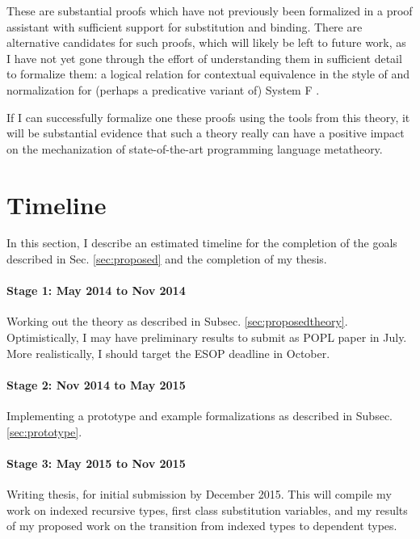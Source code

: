 \documentclass{article}
\begin{document}
These are substantial proofs which have not previously been
formalized in a proof assistant with sufficient support for
substitution and binding. There are alternative candidates for such
proofs, which will likely be left to future work, as I have not yet
gone through the effort of understanding them in sufficient detail to
formalize them: a logical relation
for contextual equivalence in the style of
\cite{Dreyer11} and normalization for (perhaps a predicative variant
of) System F \citep{ProofsAndTypes,Altenkirch93}.

If I can successfully formalize one these proofs using the tools from
this theory, it will be substantial evidence that such a theory really
can have a positive impact on the mechanization of state-of-the-art
programming language metatheory.


\section{Timeline}
In this section, I describe an estimated timeline for the completion
of the goals described in Sec. \ref{sec:proposed} and the
completion of my thesis.

\paragraph{Stage 1:  May 2014 to Nov 2014} Working out the
theory as described in Subsec. \ref{sec:proposedtheory}. Optimistically, I may have preliminary results to submit
as POPL paper in July. More realistically, I should target the ESOP deadline in October.

\paragraph{Stage 2: Nov 2014 to May 2015} Implementing a prototype and
example formalizations as described in Subsec. \ref{sec:prototype}.

\paragraph{Stage 3: May 2015 to Nov 2015} Writing thesis, for initial submission by
December 2015. This will compile my work on indexed recursive types, first class substitution
variables, and my results of my proposed work on the transition from indexed types
to dependent types.
\end{document}
